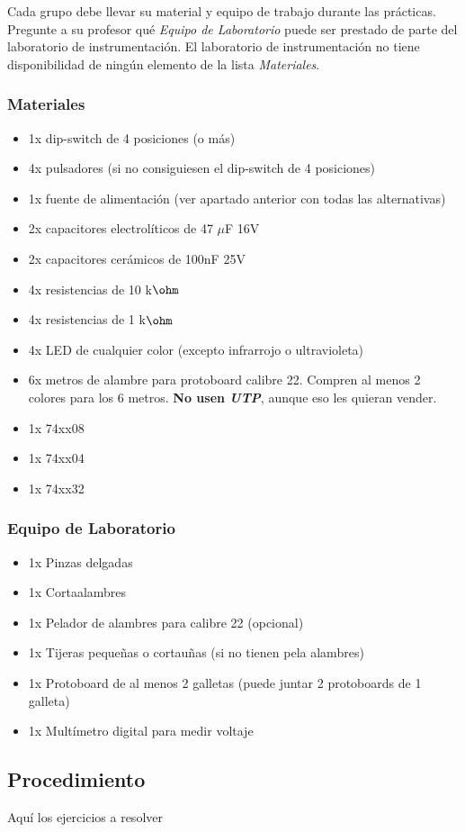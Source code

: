 Cada grupo debe llevar su material y equipo de trabajo durante las prácticas. Pregunte a su profesor qué \emph{Equipo de Laboratorio} puede ser prestado
de parte del laboratorio de instrumentación. El laboratorio de instrumentación no tiene disponibilidad de ningún elemento de la lista \emph{Materiales}.

\subsubsection*{Materiales}
\begin{itemize}
    \item 1x dip-switch de 4 posiciones (o más)
    \item 4x pulsadores (si no consiguiesen el dip-switch de 4 posiciones)
    \item 1x fuente de alimentación (ver apartado anterior con todas las alternativas)
    \item 2x capacitores electrolíticos de 47 $\mu$F 16V
    \item 2x capacitores cerámicos de 100nF 25V
    \item 4x resistencias de 10 k$\ohm$
    \item 4x resistencias de 1 k$\ohm$
    \item 4x LED de cualquier color (excepto infrarrojo o ultravioleta)
    \item 6x metros de alambre para protoboard calibre 22. Compren al menos 2 colores para los 6 metros. \textbf{No usen \emph{UTP}}, aunque eso les quieran vender.
    \item 1x 74xx08
    \item 1x 74xx04
    \item 1x 74xx32
\end{itemize}


\subsubsection*{Equipo de Laboratorio}
\begin{itemize}
    \item 1x Pinzas delgadas
    \item 1x Cortaalambres
    \item 1x Pelador de alambres para calibre 22 (opcional)
    \item 1x Tijeras pequeñas o cortauñas (si no tienen pela alambres)
    \item 1x Protoboard de al menos 2 galletas (puede juntar 2 protoboards de 1 galleta)
    \item 1x Multímetro digital para medir voltaje
\end{itemize}

\subsection{Procedimiento}
Aquí los ejercicios a resolver